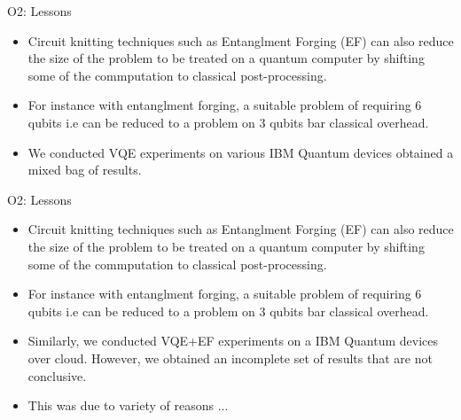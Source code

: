 \begin{frame}{O2: Lessons}
  \begin{itemize}
    \setlength\itemsep{0.1em}
    \item Circuit knitting techniques such as {\color{red}Entanglment Forging (EF)} can also reduce the size of the problem
          to be treated on a quantum computer by shifting some of the commputation to classical post-processing.

    \item For instance with entanglment forging, a suitable problem of requiring 6 qubits i.e can be reduced to a problem on 3 qubits bar classical overhead.

    \item We conducted VQE experiments on various IBM Quantum devices obtained a mixed bag of results.

  \end{itemize}
\end{frame}

\begin{frame}{O2: Lessons}
  \begin{itemize}
    \setlength\itemsep{0.1em}
    \item Circuit knitting techniques such as {\color{red}Entanglment Forging (EF)} can also reduce the size of the problem
          to be treated on a quantum computer by shifting some of the commputation to classical post-processing.

    \item For instance with entanglment forging, a suitable problem of requiring 6 qubits i.e can be reduced to a problem on 3 qubits bar classical overhead.

    \item Similarly, we conducted VQE+EF experiments on a IBM Quantum devices over cloud. However, we obtained an incomplete set of results that are not conclusive.

    \item This was due to variety of reasons ...

  \end{itemize}
\end{frame}

